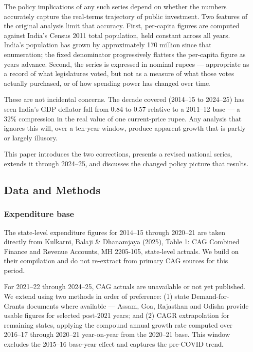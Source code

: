 \documentclass[
  11pt,
  oneside,
  10pt,
  a4paper,
  twocolumn]{article}
\begin{document}
The policy implications of any such series depend on whether the numbers
accurately capture the real-terms trajectory of public investment. Two
features of the original analysis limit that accuracy. First, per-capita
figures are computed against India's Census 2011 total population, held
constant across all years. India's population has grown by approximately
170 million since that enumeration; the fixed denominator progressively
flatters the per-capita figure as years advance. Second, the series is
expressed in nominal rupees --- appropriate as a record of what
legislatures voted, but not as a measure of what those votes actually
purchased, or of how spending power has changed over time.

These are not incidental concerns. The decade covered (2014--15 to
2024--25) has seen India's GDP deflator fall from 0.84 to 0.57 relative
to a 2011--12 base --- a 32\% compression in the real value of one
current-price rupee. Any analysis that ignores this will, over a
ten-year window, produce apparent growth that is partly or largely
illusory.

This paper introduces the two corrections, presents a revised national
series, extends it through 2024--25, and discusses the changed policy
picture that results.

\subsection{Data and Methods}\label{data-and-methods}

\subsubsection{Expenditure base}\label{expenditure-base}

The state-level expenditure figures for 2014--15 through 2020--21 are
taken directly from Kulkarni, Balaji \& Dhanamjaya (2025), Table 1: CAG
Combined Finance and Revenue Accounts, MH 2205-105, state-level actuals.
We build on their compilation and do not re-extract from primary CAG
sources for this period.

For 2021--22 through 2024--25, CAG actuals are unavailable or not yet
published. We extend using two methods in order of preference: (1) state
Demand-for-Grants documents where available --- Assam, Goa, Rajasthan
and Odisha provide usable figures for selected post-2021 years; and (2)
CAGR extrapolation for remaining states, applying the compound annual
growth rate computed over 2016--17 through 2020--21 year-on-year from
the 2020--21 base. This window excludes the 2015--16 base-year effect
and captures the pre-COVID trend.
\end{document}
